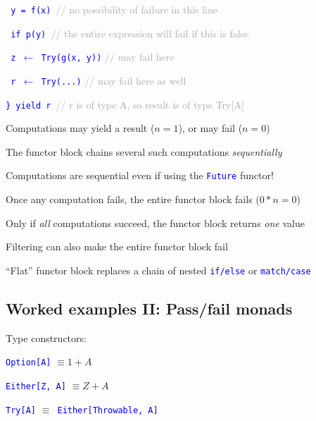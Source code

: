 \texttt{\textcolor{blue}{\footnotesize{}  y = f(x) }}\textcolor{darkgray}{\footnotesize{}//
no possibility of failure in this line}{\footnotesize\par}

\texttt{\textcolor{blue}{\footnotesize{}  if p(y) }}\textcolor{darkgray}{\footnotesize{}//
the entire expression will fail if this is false}{\footnotesize\par}

\texttt{\textcolor{blue}{\footnotesize{}  z $\leftarrow$ Try(g(x,
y))}}\textcolor{darkgray}{\footnotesize{} // may fail here}{\footnotesize\par}

\texttt{\textcolor{blue}{\footnotesize{}  r $\leftarrow$ Try(...)}}\textcolor{darkgray}{\footnotesize{}
// may fail here as well}{\footnotesize\par}

\texttt{\textcolor{blue}{\footnotesize{}\} yield r }}\textcolor{darkgray}{\footnotesize{}//
 r is of type A, so result is of type Try{[}A{]}}{\footnotesize\par}

Computations may yield a result ($n=1$), or may fail ($n=0$)

The functor block chains several such computations \emph{sequentially}

Computations are sequential even if using the \texttt{\textcolor{blue}{\footnotesize{}Future}}
functor!

Once any computation fails, the entire functor block fails ($0*n=0$)

Only if \emph{all} computations succeed, the functor block returns
\emph{one} value

Filtering can also make the entire functor block fail

``Flat'' functor block replaces a chain of nested \texttt{\textcolor{blue}{\footnotesize{}if/else}}
or \texttt{\textcolor{blue}{\footnotesize{}match/case}} 


\subsection{Worked examples II: Pass/fail monads}

Type constructors:

\texttt{\textcolor{blue}{\footnotesize{}Option{[}A{]}}} $\equiv1+A$

\texttt{\textcolor{blue}{\footnotesize{}Either{[}Z, A{]}}} $\equiv Z+A$

\texttt{\textcolor{blue}{\footnotesize{}Try{[}A{]}}} $\equiv$\texttt{\textcolor{blue}{\footnotesize{}
Either{[}Throwable, A{]}}} 

